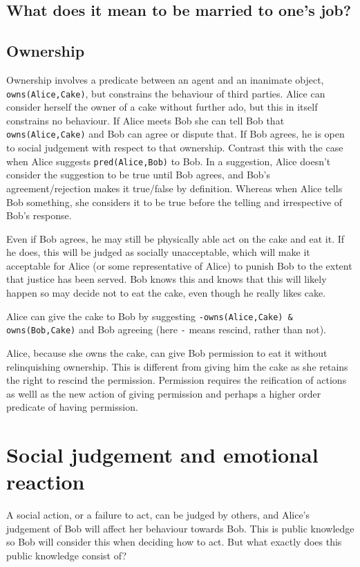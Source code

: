 \documentclass[a4paper]{article}
\begin{document}
\subsection{What does it mean to be married to one's job?}


\subsection{Ownership}

Ownership involves a predicate between an agent and an inanimate object, \texttt{owns(Alice,Cake)}, but constrains the behaviour of third parties. Alice can consider herself the owner of a cake without further ado, but this in itself constrains no behaviour. If Alice meets Bob she can tell Bob that \texttt{owns(Alice,Cake)} and Bob can agree or dispute that. If Bob agrees, he is open to social judgement with respect to that ownership. Contrast this with the case when Alice suggests \texttt{pred(Alice,Bob)} to Bob. In a suggestion, Alice doesn't consider the suggestion to be true until Bob agrees, and Bob's agreement/rejection makes it true/false by definition. Whereas when Alice tells Bob something, she considers it to be true before the telling and irrespective of Bob's response.

Even if Bob agrees, he may still be physically able act on the cake and eat it. If he does, this will be judged as socially unacceptable, which will make it acceptable for Alice (or some representative of Alice) to punish Bob to the extent that justice has been served. Bob knows this and knows that this will likely happen so may decide not to eat the cake, even though he really likes cake.

Alice can give the cake to Bob by suggesting \texttt{-owns(Alice,Cake) \& owns(Bob,Cake)} and Bob agreeing (here \texttt{-} means rescind, rather than not).

Alice, because she owns the cake, can give Bob permission to eat it without relinquishing ownership. This is different from giving him the cake as she retains the right to rescind the permission. Permission requires the reification of actions as welll as the new action of giving permission and perhaps a higher order predicate of having permission.

\section{Social judgement and emotional reaction}

A social action, or a failure to act, can be judged by others, and Alice's judgement of Bob will affect her behaviour towards Bob. This is public knowledge so Bob will consider this when deciding how to act. But what exactly does this public knowledge consist of?
\end{document}
